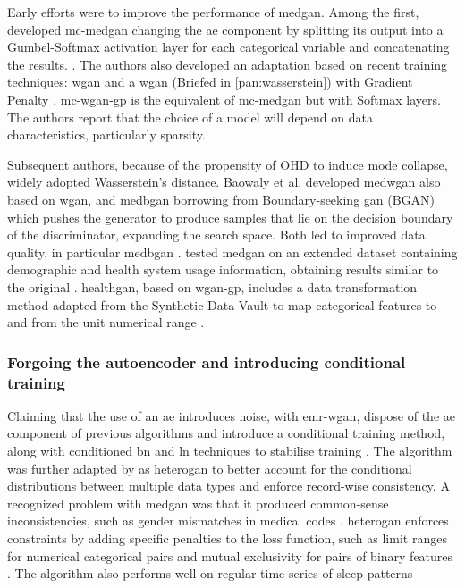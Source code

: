             Early efforts were to improve the performance of \gls{medgan}. Among the first, \citeauthor{Camino2018-re} developed \gls{mc-medgan} changing the \gls{ae} component by splitting its output into a Gumbel-Softmax \cite{jang2016categorical} activation layer for each categorical variable and concatenating the results. \cite{Camino2018-re}. The authors also developed an adaptation based on recent training techniques: \gls{wgan} \cite{arjovsky2017wasserstein} and a \gls{wgan} (Briefed in \autoref{pan:wasserstein}) with Gradient Penalty \cite{gulrajani2017improved}. \gls{mc-wgan-gp} is the equivalent of \gls{mc-medgan} but with Softmax layers. The authors report that the choice of a model will depend on data characteristics, particularly sparsity.\par
            
            
            Subsequent authors, because of the propensity of OHD to induce mode collapse, widely adopted Wasserstein’s distance. Baowaly et al. developed \gls{medwgan} also based on \gls{wgan}, and \gls{medbgan} borrowing from Boundary-seeking \gls{gan} (BGAN) \cite{hjelm2017boundaryseeking} which pushes the generator to produce samples that lie on the decision boundary of the discriminator, expanding the search space. Both led to improved data quality, in particular \gls{medbgan} \cite{baowaly_2019_IEEE,baowaly_2019_jamia}. \citeauthor{Jackson_2019} tested \gls{medgan} on an extended dataset containing demographic and health system usage information, obtaining results similar to the original \cite{Jackson_2019}. \gls{healthgan}, based on \gls{wgan-gp}, includes a data transformation method adapted from the Synthetic Data Vault \cite{Patki_2016} to map categorical features to and from the unit numerical range \cite{Yale_2020}. 
        
        \subsubsection{Forgoing the autoencoder and introducing conditional training}\label{noauto}

            Claiming that the use of an \gls{ae} introduces noise, with \gls{emr-wgan}, \citeauthor{Zhang2020} dispose of the \gls{ae} component of previous algorithms and introduce a conditional training method, along with conditioned \gls{bn} and \gls{ln} techniques to stabilise training \cite{Zhang2020}. The algorithm was further adapted by \citeauthor{yan2020generating} as \gls{heterogan} to better account for the conditional distributions between multiple data types and enforce record-wise consistency. A recognized problem with \gls{medgan} was that it produced common-sense inconsistencies, such as gender mismatches in medical codes \cite{yan2020generating, Choi2017-nt}. \gls{heterogan} enforces constraints by adding specific penalties to the loss function, such as limit ranges for numerical categorical pairs and mutual exclusivity for pairs of binary features \cite{yan2020generating}. The algorithm also performs well on regular time-series of sleep patterns \cite{dash2019synthetic} \par

